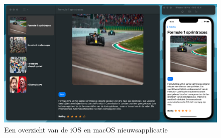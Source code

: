\begin{figure}[h]
    \centering
    \includegraphics[width=\linewidth]{img/iosenmacosapplicatie.png}
    \caption{Een overzicht van de iOS en macOS nieuwsapplicatie}
\end{figure}

